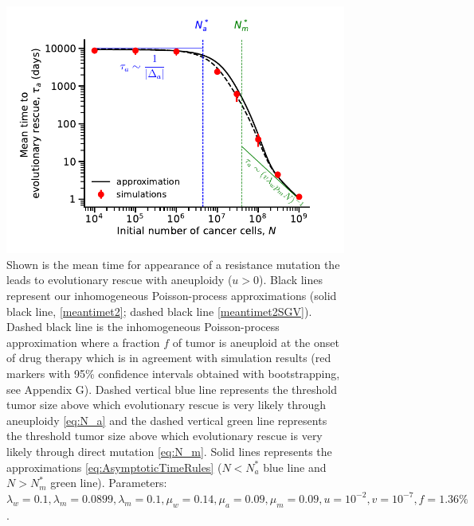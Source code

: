 \documentclass[12pt]{extarticle}
\begin{document}
\begin{figure}
\vspace*{1\baselineskip}
\includegraphics[width=1\textwidth]{Figures/SGVEvolutionaryRescueTimeComplete.pdf}
\caption{Shown is the mean time for appearance of a resistance mutation the leads to evolutionary rescue with aneuploidy ($u>0$). Black lines represent our inhomogeneous Poisson-process approximations (solid black line, \cref{meantimet2}; dashed black line \cref{meantimet2SGV}). Dashed black line is the  inhomogeneous Poisson-process approximation where a fraction $f$ of tumor is aneuploid at the onset of drug therapy which is in agreement with simulation results (red markers with 95\% confidence intervals obtained with bootstrapping, see Appendix G). Dashed vertical blue line represents the threshold tumor size above which evolutionary rescue is very likely through aneuploidy \cref{eq:N_a} and the dashed vertical green line represents the threshold tumor size above which evolutionary rescue is very likely through direct mutation \cref{eq:N_m}. Solid lines represents the approximations \cref{eq:AsymptoticTimeRules} ($N<N_a^*$ blue line and $N>N_m^*$ green line). 
Parameters: $\lambda_w=0.1,\lambda_m=0.0899,\lambda_m=0.1,\mu_w=0.14,\mu_a=0.09,\mu_m=0.09, u=10^{-2}, v=10^{-7},f=1.36\%$.}
\label{SGVEvolutionaryRescueTimeComplete}
\end{figure}
\end{document}
